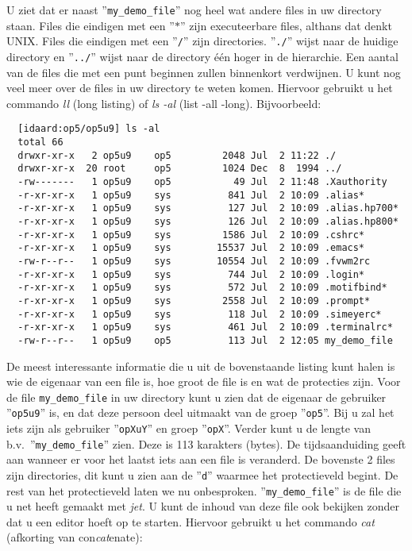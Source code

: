 U ziet dat er naast ''{\tt my\_demo\_file}'' nog heel wat andere files in uw
directory staan.
Files die eindigen met een ''{\tt $\ast$}'' zijn
executeerbare files, althans dat denkt UNIX.
Files die eindigen met een ''{\tt /}'' zijn directories.
''{\tt ./}'' wijst naar de huidige directory en
''{\tt ../}'' wijst naar de directory \'e\'en hoger in de hierarchie.
Een aantal van de files die met een punt beginnen zullen binnenkort verdwijnen.
\newline
U kunt nog veel meer over de files in uw directory te weten komen.
Hiervoor gebruikt u het commando {\em ll} (long listing)
of {\em ls -al} (list -all -long).
Bijvoorbeeld:

\begin{verbatim}
  [idaard:op5/op5u9] ls -al
  total 66
  drwxr-xr-x   2 op5u9    op5         2048 Jul  2 11:22 ./
  drwxr-xr-x  20 root     op5         1024 Dec  8  1994 ../
  -rw-------   1 op5u9    op5           49 Jul  2 11:48 .Xauthority
  -r-xr-xr-x   1 op5u9    sys          841 Jul  2 10:09 .alias*
  -r-xr-xr-x   1 op5u9    sys          127 Jul  2 10:09 .alias.hp700*
  -r-xr-xr-x   1 op5u9    sys          126 Jul  2 10:09 .alias.hp800*
  -r-xr-xr-x   1 op5u9    sys         1586 Jul  2 10:09 .cshrc*
  -r-xr-xr-x   1 op5u9    sys        15537 Jul  2 10:09 .emacs*
  -rw-r--r--   1 op5u9    sys        10554 Jul  2 10:09 .fvwm2rc
  -r-xr-xr-x   1 op5u9    sys          744 Jul  2 10:09 .login*
  -r-xr-xr-x   1 op5u9    sys          572 Jul  2 10:09 .motifbind*
  -r-xr-xr-x   1 op5u9    sys         2558 Jul  2 10:09 .prompt*
  -r-xr-xr-x   1 op5u9    sys          118 Jul  2 10:09 .simeyerc*
  -r-xr-xr-x   1 op5u9    sys          461 Jul  2 10:09 .terminalrc*
  -rw-r--r--   1 op5u9    op5          113 Jul  2 12:05 my_demo_file
\end{verbatim}

De meest interessante informatie
die u uit de bovenstaande listing kunt halen
is wie de eigenaar van een file is,
hoe groot de file is en wat de protecties zijn.
Voor de file {\tt my\_demo\_file} in uw directory kunt u zien dat de eigenaar
de gebruiker ''{\tt op5u9}'' is,
en dat deze persoon deel uitmaakt van de groep ''{\tt op5}''.
Bij u zal het iets zijn als gebruiker ''{\tt opXuY}'' en groep ''{\tt opX}''.
Verder kunt u de lengte van b.v.\ ''{\tt my\_demo\_file}'' zien.
Deze is 113 karakters (bytes).
De tijdsaanduiding geeft aan wanneer er voor het laatst iets aan een file
is veranderd.
De bovenste 2 files zijn directories,
dit kunt u zien aan de ''{\tt d}'' waarmee het protectieveld begint.
De rest van het protectieveld laten we nu  onbesproken.
''{\tt my\_demo\_file}'' is de file die u net heeft gemaakt met {\em jet}.
U kunt de inhoud van deze file ook
bekijken zonder dat u een editor hoeft op te starten.
Hiervoor gebruikt u het commando {\em cat}
(afkorting van con{\em cat}enate):

